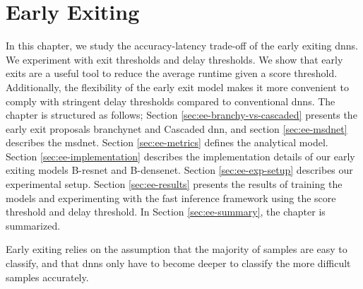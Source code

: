 \hypertarget{earlyexiting}{%
	\chapter{Early Exiting}\label{ch:earlyexit}}

In this chapter, we study the accuracy-latency trade-off of the early exiting \gls{dnn}s. We experiment with exit thresholds and delay thresholds. We show that early exits are a useful tool to reduce the average runtime given a score threshold. Additionally, the flexibility of the early exit model makes it more convenient to comply with stringent delay thresholds compared to conventional \gls{dnn}s. The chapter is structured as follows; Section \ref{sec:ee-branchy-vs-cascaded} presents the early exit proposals \gls{branchynet} and Cascaded \gls{dnn}, and section \ref{sec:ee-msdnet} describes the \gls{msdnet}. Section \ref{sec:ee-metrics} defines the analytical model. Section \ref{sec:ee-implementation} describes the implementation details of our early exiting models B-\gls{resnet} and B-\gls{densenet}. Section \ref{sec:ee-exp-setup} describes our experimental setup. Section \ref{sec:ee-results} presents the results of training the models and experimenting with the fast inference framework using the score threshold and delay threshold. In Section \ref{sec:ee-summary}, the chapter is summarized.

Early exiting relies on the assumption that the majority of samples are easy to classify, and that \gls{dnn}s only have to become deeper to classify the more difficult samples accurately. 

